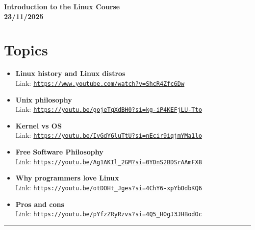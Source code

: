 \documentclass[12pt]{article}
\newcommand{\courseTitle}{Introduction to the Linux Course}
\newcommand{\courseDate}{23/11/2025}
\begin{document}
\begin{center}
\headingfont\Huge\bfseries\color{navy}
\courseTitle\\[0.5em]
\Large\color{teamred}
\courseDate
\end{center}

\section*{Topics}

\begin{itemize}
    \item \textbf{Linux history and Linux distros}
          \\Link: \href{https://www.youtube.com/watch?v=ShcR4Zfc6Dw}{\texttt{https://www.youtube.com/watch?v=ShcR4Zfc6Dw}}
    
    \item \textbf{Unix philosophy}
          \\Link: \href{https://youtu.be/gojeTqXdBH0?si=kg-iP4KEFjLU-Tto}{\texttt{https://youtu.be/gojeTqXdBH0?si=kg-iP4KEFjLU-Tto}}
    
    \item \textbf{Kernel vs OS}
          \\Link: \href{https://youtu.be/IvGdY6luTtU?si=nEcir9iqjmYMa1lo}{\texttt{https://youtu.be/IvGdY6luTtU?si=nEcir9iqjmYMa1lo}}
    
    \item \textbf{Free Software Philosophy}
          \\Link: \href{https://youtu.be/Ag1AKIl_2GM?si=0YDnS2BDSrAAmFX8}{\texttt{https://youtu.be/Ag1AKIl_2GM?si=0YDnS2BDSrAAmFX8}}
    
    \item \textbf{Why programmers love Linux}
          \\Link: \href{https://youtu.be/otDOHt\_Jges?si=4ChY6-xpYbOdbKQ6}{\texttt{https://youtu.be/otDOHt\_Jges?si=4ChY6-xpYbOdbKQ6}}
    
    \item \textbf{Pros and cons}
          \\Link: \href{https://youtu.be/pYfzZRyRzvs?si=4Q5\_H0gJ3JHBodOc}{\texttt{https://youtu.be/pYfzZRyRzvs?si=4Q5\_H0gJ3JHBodOc}}
\end{itemize}

\vspace{1em}
\begin{center}
\color{teamred}\rule{0.8\textwidth}{1pt}
\end{center}
\end{document}
